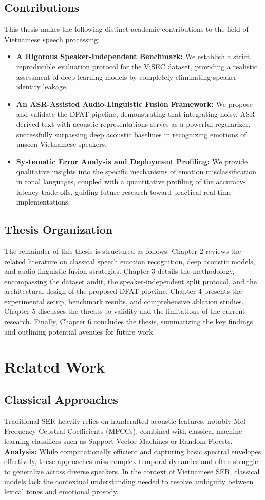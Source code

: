 \documentclass[12pt,a4paper]{report}
\begin{document}
\section{Contributions}
This thesis makes the following distinct academic contributions to the field of Vietnamese speech processing:
\begin{itemize}
    \item \textbf{A Rigorous Speaker-Independent Benchmark:} We establish a strict, reproducible evaluation protocol for the ViSEC dataset, providing a realistic assessment of deep learning models by completely eliminating speaker identity leakage.
    \item \textbf{An ASR-Assisted Audio-Linguistic Fusion Framework:} We propose and validate the DFAT pipeline, demonstrating that integrating noisy, ASR-derived text with acoustic representations serves as a powerful regularizer, successfully surpassing deep acoustic baselines in recognizing emotions of unseen Vietnamese speakers.
    \item \textbf{Systematic Error Analysis and Deployment Profiling:} We provide qualitative insights into the specific mechanisms of emotion misclassification in tonal languages, coupled with a quantitative profiling of the accuracy-latency trade-offs, guiding future research toward practical real-time implementations.
\end{itemize}

\section{Thesis Organization}
The remainder of this thesis is structured as follows. Chapter 2 reviews the related literature on classical speech emotion recognition, deep acoustic models, and audio-linguistic fusion strategies. Chapter 3 details the methodology, encompassing the dataset audit, the speaker-independent split protocol, and the architectural design of the proposed DFAT pipeline. Chapter 4 presents the experimental setup, benchmark results, and comprehensive ablation studies. Chapter 5 discusses the threats to validity and the limitations of the current research. Finally, Chapter 6 concludes the thesis, summarizing the key findings and outlining potential avenues for future work.

\chapter{Related Work}
\section{Classical Approaches}
Traditional SER heavily relies on handcrafted acoustic features, notably Mel-Frequency Cepstral Coefficients (MFCCs), combined with classical machine learning classifiers such as Support Vector Machines or Random Forests. \textbf{Analysis:} While computationally efficient and capturing basic spectral envelopes effectively, these approaches miss complex temporal dynamics and often struggle to generalize across diverse speakers. In the context of Vietnamese SER, classical models lack the contextual understanding needed to resolve ambiguity between lexical tones and emotional prosody.
\end{document}
